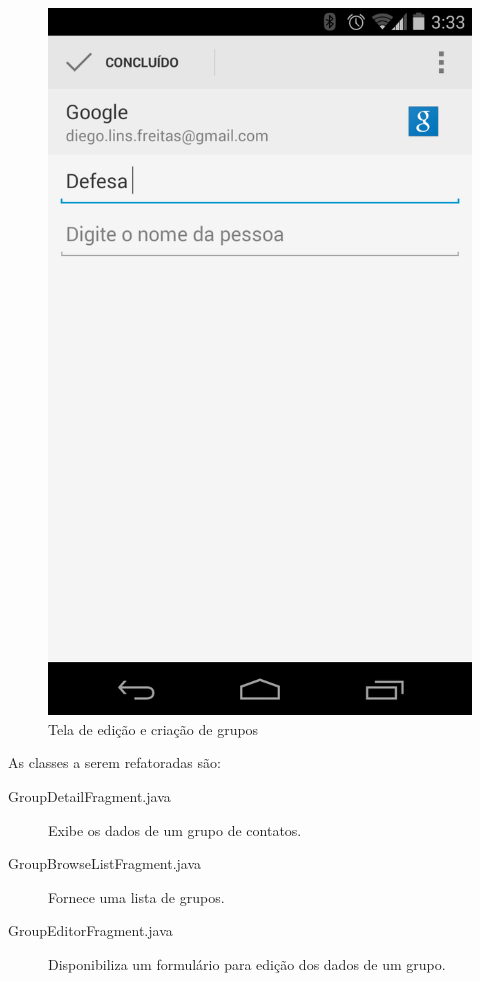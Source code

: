\begin{figure}[!ht]
\begin{minipage}[b]{0.45\linewidth}
		\includegraphics[scale=0.2]{img/contacts_edit.png}
		\caption{Tela de edição e criação de grupos} 
		\label{fig:groups_edit}
	\end{minipage}
\end{figure}


As classes a serem refatoradas são:
\begin{description}
\item[GroupDetailFragment.java] Exibe os dados de um grupo de contatos.
\item[GroupBrowseListFragment.java] Fornece uma lista de grupos.
\item[GroupEditorFragment.java] Disponibiliza um formulário para edição dos
dados de um grupo.
\end{description}

